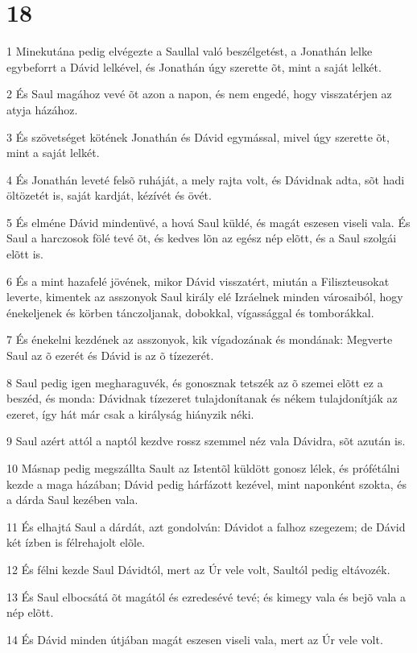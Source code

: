 \chapter{18}

\par 1 Minekutána pedig elvégezte a Saullal való beszélgetést, a Jonathán lelke egybeforrt a Dávid lelkével, és Jonathán úgy szerette õt, mint a saját lelkét.
\par 2 És Saul magához vevé õt azon a napon, és nem engedé, hogy visszatérjen az atyja házához.
\par 3 És szövetséget kötének Jonathán és Dávid egymással, mivel úgy szerette õt, mint a saját lelkét.
\par 4 És Jonathán leveté felsõ ruháját, a mely rajta volt, és Dávidnak adta, sõt hadi öltözetét is, saját kardját, kézívét és övét.
\par 5 És elméne Dávid mindenüvé, a hová Saul küldé, és magát eszesen viseli vala. És Saul a harczosok fölé tevé õt, és kedves lõn az egész nép elõtt, és a Saul szolgái elõtt is.
\par 6 És a mint hazafelé jövének, mikor Dávid visszatért, miután a Filiszteusokat leverte, kimentek az asszonyok Saul király elé Izráelnek minden városaiból, hogy énekeljenek és körben tánczoljanak, dobokkal, vígassággal és tomborákkal.
\par 7 És énekelni kezdének az asszonyok, kik vígadozának és mondának: Megverte Saul az õ ezerét és Dávid is az õ tízezerét.
\par 8 Saul pedig igen megharaguvék, és gonosznak tetszék az õ szemei elõtt ez a beszéd, és monda: Dávidnak tízezeret tulajdonítanak és nékem tulajdonítják az ezeret, így hát már csak a királyság hiányzik néki.
\par 9 Saul azért attól a naptól kezdve rossz szemmel néz vala Dávidra, sõt azután is.
\par 10 Másnap pedig megszállta Sault az Istentõl küldött gonosz lélek, és prófétálni kezde a maga házában; Dávid pedig hárfázott kezével, mint naponként szokta, és a dárda Saul kezében vala.
\par 11 És elhajtá Saul a dárdát, azt gondolván: Dávidot a falhoz szegezem; de Dávid két ízben is félrehajolt elõle.
\par 12 És félni kezde Saul Dávidtól, mert az Úr vele volt, Saultól pedig eltávozék.
\par 13 És Saul elbocsátá õt magától és ezredesévé tevé; és kimegy vala és bejõ vala a nép elõtt.
\par 14 És Dávid minden útjában magát eszesen viseli vala, mert az Úr vele volt.
